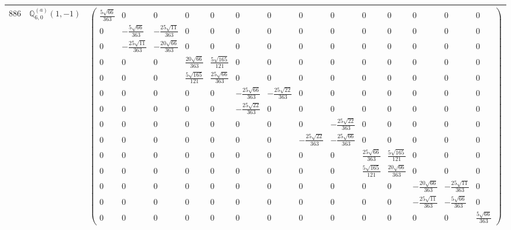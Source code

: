 \documentclass[fleqn,8pt,landscape]{jsarticle}
\begin{document}
\begin{center}
\begin{longtable}{ccc}
$ 886 $ & $ \mathbb{Q}_{6,0}^{(a)}(1,-1) $ & $ \begin{pmatrix} \frac{5 \sqrt{66}}{363} & 0 & 0 & 0 & 0 & 0 & 0 & 0 & 0 & 0 & 0 & 0 & 0 & 0 \\ 0 & - \frac{5 \sqrt{66}}{363} & - \frac{25 \sqrt{11}}{363} & 0 & 0 & 0 & 0 & 0 & 0 & 0 & 0 & 0 & 0 & 0 \\ 0 & - \frac{25 \sqrt{11}}{363} & - \frac{20 \sqrt{66}}{363} & 0 & 0 & 0 & 0 & 0 & 0 & 0 & 0 & 0 & 0 & 0 \\ 0 & 0 & 0 & \frac{20 \sqrt{66}}{363} & \frac{5 \sqrt{165}}{121} & 0 & 0 & 0 & 0 & 0 & 0 & 0 & 0 & 0 \\ 0 & 0 & 0 & \frac{5 \sqrt{165}}{121} & \frac{25 \sqrt{66}}{363} & 0 & 0 & 0 & 0 & 0 & 0 & 0 & 0 & 0 \\ 0 & 0 & 0 & 0 & 0 & - \frac{25 \sqrt{66}}{363} & - \frac{25 \sqrt{22}}{363} & 0 & 0 & 0 & 0 & 0 & 0 & 0 \\ 0 & 0 & 0 & 0 & 0 & - \frac{25 \sqrt{22}}{363} & 0 & 0 & 0 & 0 & 0 & 0 & 0 & 0 \\ 0 & 0 & 0 & 0 & 0 & 0 & 0 & 0 & - \frac{25 \sqrt{22}}{363} & 0 & 0 & 0 & 0 & 0 \\ 0 & 0 & 0 & 0 & 0 & 0 & 0 & - \frac{25 \sqrt{22}}{363} & - \frac{25 \sqrt{66}}{363} & 0 & 0 & 0 & 0 & 0 \\ 0 & 0 & 0 & 0 & 0 & 0 & 0 & 0 & 0 & \frac{25 \sqrt{66}}{363} & \frac{5 \sqrt{165}}{121} & 0 & 0 & 0 \\ 0 & 0 & 0 & 0 & 0 & 0 & 0 & 0 & 0 & \frac{5 \sqrt{165}}{121} & \frac{20 \sqrt{66}}{363} & 0 & 0 & 0 \\ 0 & 0 & 0 & 0 & 0 & 0 & 0 & 0 & 0 & 0 & 0 & - \frac{20 \sqrt{66}}{363} & - \frac{25 \sqrt{11}}{363} & 0 \\ 0 & 0 & 0 & 0 & 0 & 0 & 0 & 0 & 0 & 0 & 0 & - \frac{25 \sqrt{11}}{363} & - \frac{5 \sqrt{66}}{363} & 0 \\ 0 & 0 & 0 & 0 & 0 & 0 & 0 & 0 & 0 & 0 & 0 & 0 & 0 & \frac{5 \sqrt{66}}{363} \end{pmatrix} $ \\ \hline

\end{longtable}
\end{center}
\end{document}
